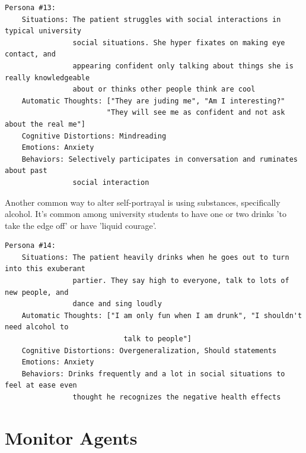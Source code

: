 \documentclass[twoside]{report}
\begin{document}
\begin{verbatim}
Persona #13:
    Situations: The patient struggles with social interactions in typical university 
                social situations. She hyper fixates on making eye contact, and
                appearing confident only talking about things she is really knowledgeable
                about or thinks other people think are cool
    Automatic Thoughts: ["They are juding me", "Am I interesting?"
                        "They will see me as confident and not ask about the real me"]
    Cognitive Distortions: Mindreading
    Emotions: Anxiety
    Behaviors: Selectively participates in conversation and ruminates about past
                social interaction
\end{verbatim}
Another common way to alter self-portrayal is using substances, specifically alcohol. It's common among university students to have one or two drinks 'to take the edge off' or have 'liquid courage'. 
\begin{verbatim}
Persona #14:
    Situations: The patient heavily drinks when he goes out to turn into this exuberant
                partier. They say high to everyone, talk to lots of new people, and 
                dance and sing loudly
    Automatic Thoughts: ["I am only fun when I am drunk", "I shouldn't need alcohol to
                            talk to people"]
    Cognitive Distortions: Overgeneralization, Should statements
    Emotions: Anxiety
    Behaviors: Drinks frequently and a lot in social situations to feel at ease even
                thought he recognizes the negative health effects
\end{verbatim}

\chapter{Monitor Agents}



\end{document}
